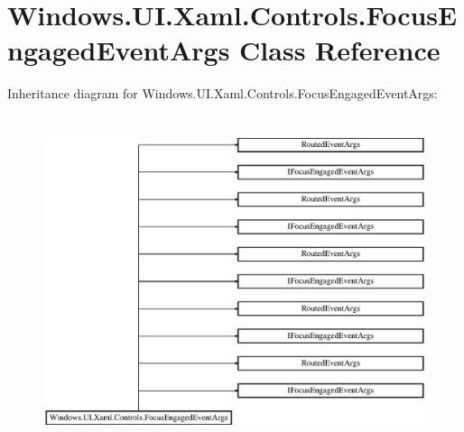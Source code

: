 \hypertarget{class_windows_1_1_u_i_1_1_xaml_1_1_controls_1_1_focus_engaged_event_args}{}\section{Windows.\+U\+I.\+Xaml.\+Controls.\+Focus\+Engaged\+Event\+Args Class Reference}
\label{class_windows_1_1_u_i_1_1_xaml_1_1_controls_1_1_focus_engaged_event_args}
Inheritance diagram for Windows.\+U\+I.\+Xaml.\+Controls.\+Focus\+Engaged\+Event\+Args\+:\begin{figure}[H]
\begin{center}
\leavevmode
\includegraphics[height=9.746835cm]{class_windows_1_1_u_i_1_1_xaml_1_1_controls_1_1_focus_engaged_event_args}
\end{center}
\end{figure}
